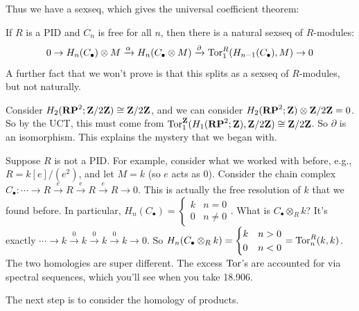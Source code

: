 Thus we have a sexseq, which gives the universal coefficient theorem:
\begin{theorem}
If $R$ is a PID and $C_n$ is free for all $n$, then there is a natural sexseq of $R$-modules:
\begin{equation*}
0\to H_n(C_\bullet)\otimes M\xrightarrow{\alpha} H_n(C_\bullet\otimes M)\xrightarrow{\partial}\operatorname{Tor}^R_1( H_{n-1}(C_\bullet),M)\to 0
\end{equation*}
A further fact that we won't prove is that this splits as a sexseq of $R$-modules, but not naturally.
\end{theorem}
\begin{example}
Consider $ H_2(\mathbf{RP}^2;\mathbf Z/2\mathbf Z)\cong\mathbf Z/2\mathbf Z$, and we can consider $ H_2(\mathbf{RP}^2;\mathbf Z)\otimes\mathbf Z/2\mathbf Z=0$. So by the UCT, this must come from $\operatorname{Tor}^\mathbf Z_1( H_1(\mathbf{RP}^2;\mathbf Z),\mathbf Z/2\mathbf Z)\cong\mathbf Z/2\mathbf Z$. So $\partial$ is an isomorphism. This explains the mystery that we began with.
\end{example}
\begin{remark}
Suppose $R$ is not a PID. For example, consider what we worked with before, e.g., $R=k[e]/(e^2)$, and let $M=k$ (so $e$ acts as $0$). Consider the chain complex $C_\bullet:\cdots\to R\xrightarrow{e}R\xrightarrow{e} R\xrightarrow{e}R\to 0$. This is actually the free resolution of $k$ that we found before. In particular, $ H_n(C_\bullet)=\begin{cases}k & n=0 \\ 0 & n\neq 0\end{cases}$. What is $C_\bullet\otimes_R k$? It's exactly $\cdots\to k\xrightarrow{0}k\xrightarrow{0} k\xrightarrow{0}k\to 0$. So $ H_n(C_\bullet\otimes_R k)=\begin{cases}k & n>0 \\ 0 & n<0\end{cases}=\operatorname{Tor}^R_n(k,k)$. The two homologies are super different. The excess $\operatorname{Tor}$'s are accounted for via spectral sequences, which you'll see when you take 18.906.
\end{remark}
The next step is to consider the homology of products.
